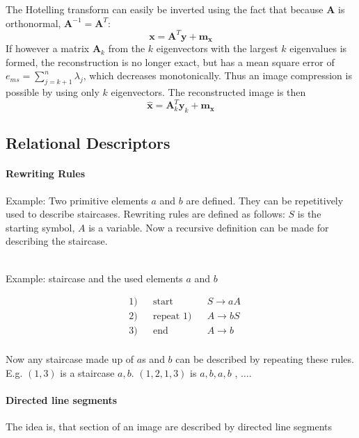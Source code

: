 The Hotelling transform can easily be inverted using the fact that because $\mathbf{A}$ is orthonormal, $\mathbf{A}^{-1} = \mathbf{A}^T$:
	\[
		\mathbf{x} = \mathbf{A}^T \mathbf{y} + \mathbf{m_x}
	\]
If however a matrix $\mathbf{A}_k$ from the $k$ eigenvectors with the largest $k$ eigenvalues is formed, the reconstruction is no longer exact, but has a mean square error of $e_{ms} = \sum\limits_{j=k+1}^{n} \lambda_j$, which decreases monotonically.
Thus an image compression is possible by using only $k$ eigenvectors. The reconstructed image is then
	\[
		\hat{\mathbf{x}} = \mathbf{A}_k^T \mathbf{y}_k + \mathbf{m_x}
	\]
\subsection{Relational Descriptors}

\paragraph{Rewriting Rules}
Example:
Two primitive elements $a$ and $b$ are defined. They can be repetitively used to describe staircases.
Rewriting rules are defined as follows: $S$ is the starting symbol, $A$ is a variable.
Now a recursive definition can be made for describing the staircase.

\begin{multicols}{2}
\begin{center}
	 \\
	Example: staircase and the used elements $a$ and $b$
\end{center}
\vfill
\columnbreak
\begin{align*}
& 1) && \text{start} && S \rightarrow aA\\
& 2) && \text{repeat 1)} &&  A \rightarrow bS \\
& 3) && \text{end} &&  A \rightarrow b \\
\end{align*}
\end{multicols}
Now any staircase made up of $a$s and $b$ can be described by repeating these rules.
E.g. $(1,3)$ is a staircase $a,b$. $(1,2,1,3)$ is $a,b,a,b$ , $\ldots$. \\

\paragraph{Directed line segments} The idea is, that section of an image are described by directed line segments


